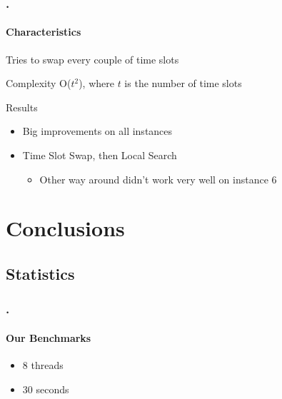 \documentclass{beamer}
\begin{document}
\begin{frame}
\frametitle{\thesection.\thesubsection \ \insertsubsection}
   \framesubtitle{Characteristics}
   \begin{exampleblock} {Tries to swap every couple of time slots}

	
	Complexity O($t^2$), where $t$ is the number of time slots 

	\end{exampleblock}
\begin{block} {Results}
	\begin{itemize}
		\item Big improvements on all instances
		\item Time Slot Swap, then Local Search
		\begin{itemize}
			\item Other way around didn't work very well on instance 6
		\end{itemize}
	\end{itemize}
\end{block}




\end{frame}
\section{Conclusions}




\subsection{Statistics}

\begin{frame}
\frametitle{\thesection.\thesubsection \ \insertsubsection}
\framesubtitle{Our Benchmarks}

\begin{itemize}
	\item 8 threads
	\item 30 seconds
\end{itemize}
\end{frame}
\end{document}
